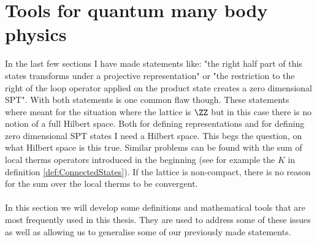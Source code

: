\section{Tools for quantum many body physics}
\label{sec:ToolsForQuantumManyBody}
In the last few sections I have made statements like: "the right half part of this states transforms under a projective representation" or "the restriction to the right of the loop operator applied on the product state creates a zero dimensional SPT". With both statements is one common flaw though. These statements where meant for the situation where the lattice is $\ZZ$ but in this case there is no notion of a full Hilbert space. Both for defining representations and for defining zero dimensional SPT states I need a Hilbert space. This begs the question, on what Hilbert space is this true. Similar problems can be found with the sum of local therms operators introduced in the beginning (see for example the $K$ in definition \ref{def:ConnectedStates}). If the lattice is non-compact, there is no reason for the sum over the local therms to be convergent.\\\\
In this section we will develop some definitions and mathematical tools that are most frequently used in this thesis. They are used to address some of these issues as well as allowing us to generalise some of our previously made statements.
